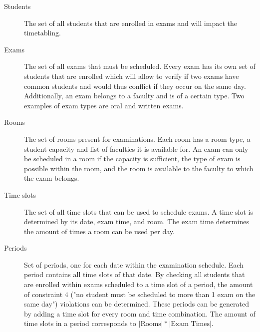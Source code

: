 \begin{description}
   \item [Students] The set of all students that are enrolled in exams and will impact the timetabling.
   \item[Exams] The set of all exams that must be scheduled. Every exam has its own set of students that are enrolled which will allow to verify if two exams have common students and would thus conflict if they occur on the same day. Additionally, an exam belongs to a faculty and is of a certain type. Two examples of exam types are oral and written exams.
   \item[Rooms] The set of rooms present for examinations. Each room has a room type, a student capacity and  list of faculties it is available for. An exam can only be scheduled in a room if the capacity is sufficient, the type of exam is possible within the room, and the room is available to the faculty to which the exam belongs.
    \item[Time slots] The set of all time slots that can be used to schedule exams. A time slot is determined by its date, exam time, and room. The exam time determines the amount of times a room can be used per day.
    \item[Periods] Set of periods, one for each date within the examination schedule. Each period contains all time slots of that date. By checking all students that are enrolled within exams scheduled to a time slot of a period, the amount of constraint 4 ("no student must be scheduled to more than 1 exam on the same day") violations can be determined. These periods can be generated by adding a time slot for every room and time combination. The amount of time slots in a period corresponds to $|\text{Rooms}| * |\text{Exam Times}|$.
\end{description}

